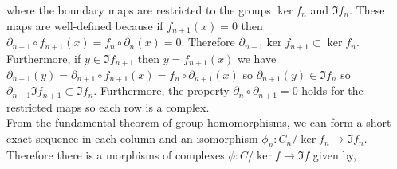 \documentclass[12pt]{extarticle}
\begin{document}
\begin{center}
\end{center}
where the boundary maps are restricted to the groups $\ker{f_n}$ and $\Im{f_n}$. These maps are well-defined because if $f_{n+1}(x) = 0$ then $\partial_{n+1} \circ f_{n+1}(x) = f_{n} \circ \partial_n(x) = 0$. Therefore $\partial_{n+1} \ker{f_{n+1}} \subset \ker{f_{n}}$. Furthermore, if $y \in \Im{f_{n+1}}$ then $y = f_{n+1}(x)$ we have $\partial_{n+1}(y) = \partial_{n+1} \circ f_{n+1}(x) = f_{n} \circ \partial_{n+1}(x)$ so $\partial_{n+1}(y) \in \Im{f_{n}}$ so $\partial_{n+1} \Im{f_{n+1}} \subset \Im{f_n}$. Furthermore, the property $\partial_{n} \circ \partial_{n+1} = 0$ holds for the restricted maps so each row is a complex.
\bigskip\\
From the fundamental theorem of group homomorphisms, we can form a short exact sequence in each column and an isomorphism $\phi_n : C_n / \ker{f_n} \to \Im{f_n}$. Therefore there is a morphisms of complexes $\phi : C / \ker{f} \to \Im{f}$ given by,
\end{document}
